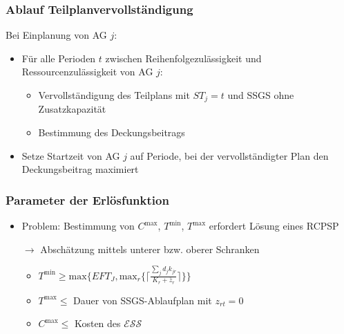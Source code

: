 \begin{frame}[noframenumbering]
	\frametitle{Ablauf Teilplanvervollständigung}
	Bei Einplanung von AG $j$:
	\vspace*{2mm}
	\begin{itemize}
		\item Für alle Perioden $t$ zwischen Reihenfolgezulässigkeit und Ressourcenzulässigkeit von AG $j$:
		\begin{itemize}
			\item Vervollständigung des Teilplans mit $ST_j=t$ und SSGS ohne Zusatzkapazität
			\item Bestimmung des Deckungsbeitrags\\[3mm]
		\end{itemize}
		\item Setze Startzeit von AG $j$ auf Periode, bei der vervollständigter Plan den Deckungsbeitrag maximiert
	\end{itemize}
\end{frame}



\begin{frame}[noframenumbering]
\frametitle{Parameter der Erlösfunktion}
\begin{itemize}
\item Problem: Bestimmung von $C^{\mbox{max}}$, $T^{\mbox{min}}$, $T^{\mbox{max}}$ erfordert Lösung eines RCPSP\\[5mm]
\item[$\rightarrow$]  Abschätzung mittels unterer bzw. oberer Schranken\\[2mm]
\begin{itemize}
\item $T^{\mbox{min}} \geq \mbox{max}\{EFT_{J},\mbox{max}_{r}\{\lceil\frac{\sum_{j}d_{j}k_{jr}}{K_{r}+\overline{z}_{r}}\rceil\}\}$\\[1mm]
\item $T^{\mbox{max}} \leq$ Dauer von SSGS-Ablaufplan mit $z_{rt}=0$\\[4mm]
\item $C^{\mbox{max}} \leq $ Kosten des $\mathcal{ESS}$
\end{itemize}
\end{itemize}
\end{frame}

